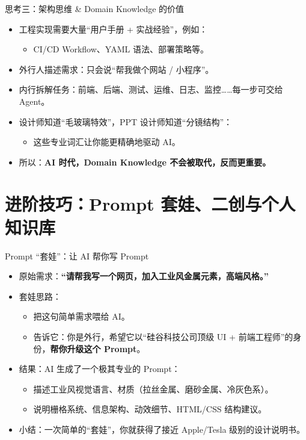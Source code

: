 \documentclass[aspectratio=169]{beamer}
\begin{document}
\begin{frame}{思考三：架构思维 \& Domain Knowledge 的价值}
  \begin{itemize}
    \item 工程实现需要大量“用户手册 + 实战经验”，例如：
      \begin{itemize}
        \item CI/CD Workflow、YAML 语法、部署策略等。
      \end{itemize}
    \item 外行人描述需求：只会说“帮我做个网站 / 小程序”。
    \item 内行拆解任务：前端、后端、测试、运维、日志、监控……每一步可交给 Agent。
    \item 设计师知道“毛玻璃特效”，PPT 设计师知道“分镜结构”：
      \begin{itemize}
        \item 这些专业词汇让你能更精确地驱动 AI。
      \end{itemize}
    \item 所以：\textbf{AI 时代，Domain Knowledge 不会被取代，反而更重要。}
  \end{itemize}
\end{frame}

\section{进阶技巧：Prompt 套娃、二创与个人知识库}

\begin{frame}{Prompt “套娃”：让 AI 帮你写 Prompt}
  \begin{itemize}
    \item 原始需求：\textbf{“请帮我写一个网页，加入工业风金属元素，高端风格。”}
    \item 套娃思路：
      \begin{itemize}
        \item 把这句简单需求喂给 AI。
        \item 告诉它：你是外行，希望它以“硅谷科技公司顶级 UI + 前端工程师”的身份，\textbf{帮你升级这个 Prompt}。
      \end{itemize}
    \item 结果：AI 生成了一个极其专业的 Prompt：
      \begin{itemize}
        \item 描述工业风视觉语言、材质（拉丝金属、磨砂金属、冷灰色系）。
        \item 说明栅格系统、信息架构、动效细节、HTML/CSS 结构建议。
      \end{itemize}
    \item 小结：一次简单的“套娃”，你就获得了接近 Apple/Tesla 级别的设计说明书。
  \end{itemize}
\end{frame}
\end{document}
